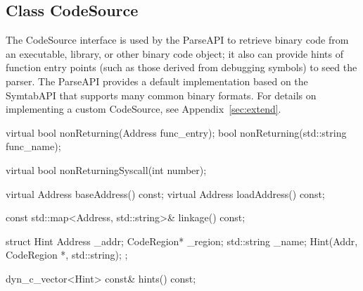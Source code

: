 \subsection{Class CodeSource}
\label{sec:codesource}


The CodeSource interface is used by the ParseAPI to retrieve binary code from
an executable, library, or other binary code object; it also can provide hints
of function entry points (such as those derived from debugging symbols) to seed
the parser. The ParseAPI provides a default implementation based on the
SymtabAPI that supports many common binary formats. For details on implementing
a custom CodeSource, see Appendix~\ref{sec:extend}.

\begin{apient}
virtual bool nonReturning(Address func_entry);
bool nonReturning(std::string func_name);
\end{apient}

\begin{apient}
virtual bool nonReturningSyscall(int number);
\end{apient}


\begin{apient}
virtual Address baseAddress() const;
virtual Address loadAddress() const;
\end{apient}

\begin{apient}
const std::map<Address, std::string>& linkage() const;
\end{apient}

\begin{apient}
struct Hint {
    Address _addr;
    CodeRegion* _region;
    std::string _name;
    Hint(Addr, CodeRegion *, std::string);
};

dyn_c_vector<Hint> const& hints() const;
\end{apient}

